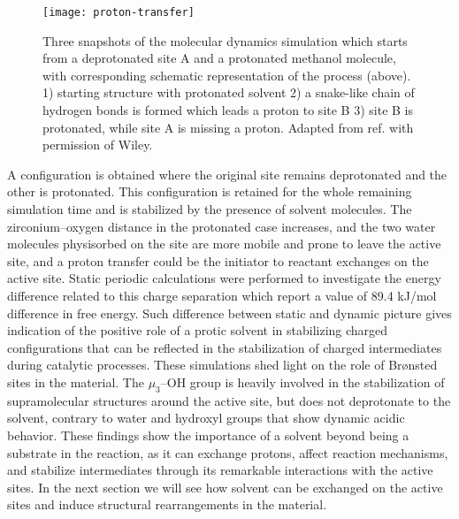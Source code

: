 \npar
\begin{figure}[!htbp]
	\centering
	\texttt{[image: proton-transfer]}
	\caption{Three snapshots of the molecular dynamics simulation which starts from a deprotonated site A and a protonated methanol molecule, with corresponding schematic representation of the process (above). 1) starting structure with protonated solvent 2) a snake-like chain of hydrogen bonds is formed which leads a proton to site B 3) site B is protonated, while site A is missing a proton. Adapted from ref. \cite{caratelli2018influence} with permission of Wiley.}
	\label{fig:proton-transfer}
\end{figure}
A configuration is obtained where the original site remains deprotonated and the other is protonated. This configuration is retained for the whole remaining simulation time and is stabilized by the presence of solvent molecules. The zirconium--oxygen distance in the protonated case increases, and the two water molecules physisorbed on the site are more mobile and prone to leave the active site, and a proton transfer could be the initiator to reactant exchanges on the active site. Static periodic calculations were performed to investigate the energy difference related to this charge separation which report a value of 89.4 kJ/mol difference in free energy. Such difference between static and dynamic picture gives indication of the positive role of a protic solvent in stabilizing charged configurations that can be reflected in the stabilization of charged intermediates during catalytic processes. These simulations shed light on the role of Br\o{}nsted sites in the material. The $\mu_3$--OH group is heavily involved in the stabilization of supramolecular structures around the active site, but does not deprotonate to the solvent, contrary to water and hydroxyl groups that show dynamic acidic behavior. These findings show the importance of a solvent beyond being a substrate in the reaction, as it can exchange protons, affect reaction mechanisms, and stabilize intermediates through its remarkable interactions with the active sites. In the next section we will see how solvent can be exchanged on the active sites and induce structural rearrangements in the material.

